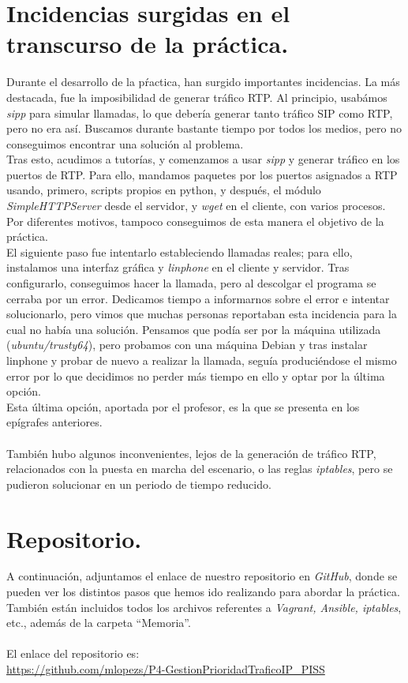 \documentclass[11pt]{article}
\begin{document}
\section{Incidencias surgidas en el transcurso de la práctica.}
Durante el desarrollo de la pŕactica, han surgido importantes incidencias. La más destacada, fue la imposibilidad de generar tráfico RTP. Al principio, usabámos \textit{sipp} para simular llamadas, lo que debería generar tanto tráfico SIP como RTP, pero no era así. Buscamos durante bastante tiempo por todos los medios, pero no conseguimos encontrar una solución al problema.\\
Tras esto, acudimos a tutorías, y comenzamos a usar \textit{sipp} y generar tráfico en los puertos de RTP. Para ello, mandamos paquetes por los puertos asignados a RTP usando, primero, scripts propios en python, y después, el módulo  \textit{SimpleHTTPServer} desde el servidor, y \textit{wget} en el cliente, con varios procesos. Por diferentes motivos, tampoco conseguimos de esta manera el objetivo de la práctica.\\
El siguiente paso fue intentarlo estableciendo llamadas reales; para ello, instalamos una interfaz gráfica y \textit{linphone} en el cliente y servidor. Tras configurarlo, conseguimos hacer la llamada, pero al descolgar el programa se cerraba por un error. Dedicamos tiempo a informarnos sobre el error e intentar solucionarlo, pero vimos que muchas personas reportaban esta incidencia para la cual no había una solución. Pensamos que podía ser por la máquina utilizada (\textit{ubuntu/trusty64}), pero probamos con una máquina Debian y tras instalar linphone y probar de nuevo a realizar la llamada, seguía produciéndose el mismo error por lo que decidimos no perder más tiempo en ello y optar por la última opción.\\
Esta última opción, aportada por el profesor, es la que se presenta en los epígrafes anteriores.\\ \\
También hubo algunos inconvenientes, lejos de la generación de tráfico RTP, relacionados con la puesta en marcha del escenario, o las reglas \textit{iptables}, pero se pudieron solucionar en un periodo de tiempo reducido. \\

\section{Repositorio.}
A continuación, adjuntamos el enlace de nuestro repositorio en \textit{GitHub}, donde se pueden ver los distintos pasos que hemos ido realizando para abordar la práctica.\\
También están incluidos todos los archivos referentes a \textit{Vagrant, Ansible, iptables}, etc., además de la carpeta ``Memoria''. \\ \\
El enlace del repositorio es: \\ \url{https://github.com/mlopezs/P4-GestionPrioridadTraficoIP_PISS}
\newpage
\end{document}
